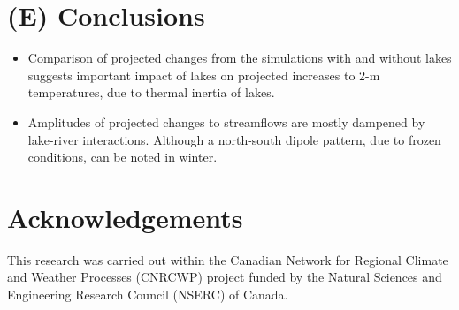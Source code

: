 \documentclass[a0,landscape]{a0poster}
\begin{document}
\begin{multicols}{3}
\begin{minipage}[t]{\linewidth}
\end{minipage}




\color{SaddleBrown} %

\section*{(E) Conclusions}

\begin{itemize}
\item Comparison of projected changes from the simulations with and without lakes suggests important impact of lakes on projected increases to 2-m temperatures, due to thermal inertia of lakes.
\item Amplitudes of projected changes to streamflows are mostly dampened by lake-river interactions. Although a north-south dipole pattern, due to frozen conditions, can be noted in winter.
\end{itemize}

\color{DarkSlateGray} %



\nocite{*} %
\small

\section*{Acknowledgements}
\small
This research was carried out within the Canadian Network for Regional Climate and Weather Processes (CNRCWP) project funded by the Natural Sciences and Engineering Research Council (NSERC) of Canada.

\end{multicols}
\end{document}
